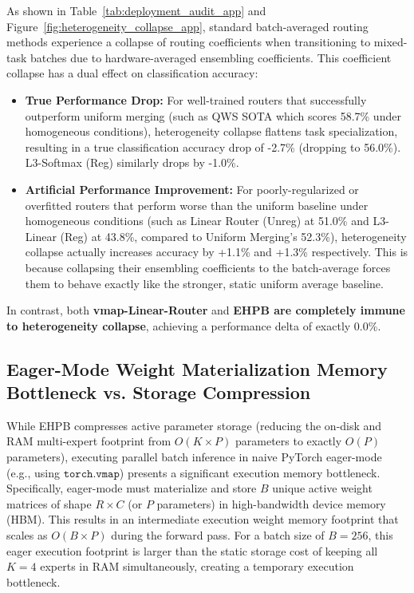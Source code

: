\documentclass{article}
\theoremstyle{plain}
\theoremstyle{definition}
\theoremstyle{remark}
\begin{document}
As shown in Table~\ref{tab:deployment_audit_app} and Figure~\ref{fig:heterogeneity_collapse_app}, standard batch-averaged routing methods experience a collapse of routing coefficients when transitioning to mixed-task batches due to hardware-averaged ensembling coefficients. This coefficient collapse has a dual effect on classification accuracy:
\begin{itemize}
\item \textbf{True Performance Drop:} For well-trained routers that successfully outperform uniform merging (such as QWS SOTA which scores 58.7\% under homogeneous conditions), heterogeneity collapse flattens task specialization, resulting in a true classification accuracy drop of -2.7\% (dropping to 56.0\%). L3-Softmax (Reg) similarly drops by -1.0\%.
\item \textbf{Artificial Performance Improvement:} For poorly-regularized or overfitted routers that perform worse than the uniform baseline under homogeneous conditions (such as Linear Router (Unreg) at 51.0\% and L3-Linear (Reg) at 43.8\%, compared to Uniform Merging's 52.3\%), heterogeneity collapse actually increases accuracy by +1.1\% and +1.3\% respectively. This is because collapsing their ensembling coefficients to the batch-average forces them to behave exactly like the stronger, static uniform average baseline.
\end{itemize}

In contrast, both \textbf{vmap-Linear-Router} and \textbf{EHPB are completely immune to heterogeneity collapse}, achieving a performance delta of exactly 0.0\%.

\subsection{Eager-Mode Weight Materialization Memory Bottleneck vs. Storage Compression}
\label{app:eager_memory_paradox}

While EHPB compresses active parameter storage (reducing the on-disk and RAM multi-expert footprint from $O(K \times P)$ parameters to exactly $O(P)$ parameters), executing parallel batch inference in naive PyTorch eager-mode (e.g., using $\mathtt{torch.vmap}$) presents a significant execution memory bottleneck. Specifically, eager-mode must materialize and store $B$ unique active weight matrices of shape $R \times C$ (or $P$ parameters) in high-bandwidth device memory (HBM). This results in an intermediate execution weight memory footprint that scales as $O(B \times P)$ during the forward pass. For a batch size of $B=256$, this eager execution footprint is larger than the static storage cost of keeping all $K=4$ experts in RAM simultaneously, creating a temporary execution bottleneck.
\end{document}
